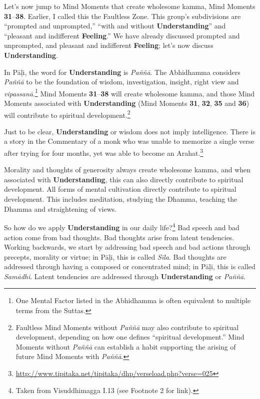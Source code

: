 Let’s now jump to Mind Moments that create wholesome kamma, Mind Moments \textbf{31}--\textbf{38}. Earlier, I called this the Faultless Zone. This group's subdivisions are “prompted and unprompted,” “with and without \textbf{Understanding}” and “pleasant and indifferent \textbf{Feeling}.” We have already discussed prompted and unprompted, and pleasant and indifferent \textbf{Feeling}; let’s now discuss \textbf{Understanding}.

In Pāḷi, the word for \textbf{Understanding} is \textit{Paññā}. The Abhidhamma considers \textit{Paññā} to be the foundation of wisdom, investigation, insight, right view and \textit{vipassanā}.\footnote{One Mental Factor listed in the Abhidhamma is often equivalent to multiple terms from the Suttas.} Mind Moments \textbf{31}--\textbf{38} will create wholesome kamma, and those Mind Moments associated with \textbf{Understanding} (Mind Moments \textbf{31}, \textbf{32}, \textbf{35} and \textbf{36}) will contribute to spiritual development.\footnote{Faultless Mind Moments without \textit{Paññā} may also contribute to spiritual development, depending on how one defines “spiritual development.” Mind Moments without \textit{Paññā} can establish a habit supporting the arising of future Mind Moments with \textit{Paññā}.}

\pagebreak

Just to be clear, \textbf{Understanding} or wisdom does not imply intelligence. There is a story in the Commentary of a monk who was unable to memorize a single verse after trying for four months, yet was able to become an Arahat.\footnote{\url{http://www.tipitaka.net/tipitaka/dhp/verseload.php?verse=025}}

Morality and thoughts of generosity always create wholesome kamma, and when associated with \textbf{Understanding}, this can also directly contribute to spiritual development. All forms of mental cultivation directly contribute to spiritual development. This includes meditation, studying the Dhamma, teaching the Dhamma and straightening of views.

So how do we apply \textbf{Understanding} in our daily life?\footnote{Taken from Visuddhimagga I.13 (see Footnote 2 for link).} Bad speech and bad action come from bad thoughts. Bad thoughts arise from latent tendencies. Working backwards, we start by addressing bad speech and bad actions through precepts, morality or virtue; in Pāḷi, this is called \textit{Sīla}. Bad thoughts are addressed through having a composed or concentrated mind; in Pāḷi, this is called \textit{Samādhi}. Latent tendencies are addressed through \textbf{Understanding} or \textit{Paññā}.

